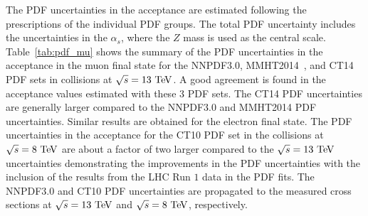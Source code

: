 The PDF uncertainties in the acceptance are estimated following the prescriptions of the individual PDF groups. The total PDF uncertainty includes the  uncertainties in the $\alpha_s$, where the $Z$ mass is used as the central scale.  Table~\ref{tab:pdf_mu} shows the summary of the PDF uncertainties in the acceptance in the muon final state for the NNPDF3.0, MMHT2014~\cite{Harland-Lang:2014zoa}, and CT14~\cite{Dulat:2015mca} PDF sets in collisions at $\sqrt{s}=13~\TeV$. A good agreement is found in the acceptance values estimated with these $3$ PDF sets. The CT14 PDF uncertainties are generally larger compared to the NNPDF3.0 and MMHT2014 PDF uncertainties. Similar results are obtained for the electron final state. The PDF uncertainties in the acceptance for the CT10 PDF set in the collisions at $\sqrt{s}=8~\mathrm{Te\kern -0.1em V}$ are about a factor of two larger compared to the $\sqrt{s}=13~\TeV$ uncertainties demonstrating the improvements in the PDF uncertainties with the inclusion of the results from the LHC Run $1$ data in the PDF fits. The NNPDF3.0 and CT10 PDF uncertainties are propagated to the measured cross sections at $\sqrt{s}=13~\TeV$ and $\sqrt{s}=8~\mathrm{Te\kern -0.1em V}$, respectively.     
\begin{table}[htbp]
\begin{center}
\caption{The summary of the theoretical uncertainties in the acceptance values in the electron final state in collisions at $\sqrt{s}=13~\TeV$. The uncertainties due to higher order QCD contributions, PDFs, FSR modeling, and missing EWK contributions are shown.}
\label{tab_el}
\end{center}
\end{table}

